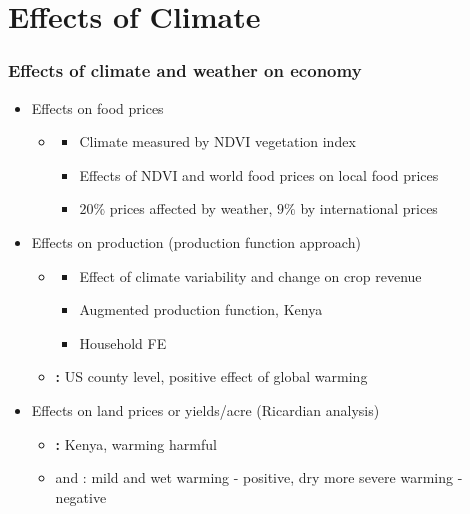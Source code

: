 \documentclass{beamer}              %
\begin{document}
\section{Effects of Climate}

\begin{frame}

\frametitle{Effects of climate and weather on economy}\label{EffectsCLimate} 


\begin{itemize}

\item Effects on food prices

\begin{itemize}

\item \textbf{\cite{Brown2015}}
\begin{itemize}
\item  Climate measured by NDVI vegetation index 
\item  Effects of NDVI and world food prices on local food prices
\item $20\%$ prices affected by weather, $9\%$ by international prices
\end{itemize}

\end{itemize}


\item Effects on production (production function approach)
\begin{itemize}
\item \textbf{\cite{Ochieng2016}}
\begin{itemize}
\item Effect of climate variability and change on crop revenue
\item Augmented production function, Kenya
\item  Household FE
\end{itemize}
\item \textbf{\cite{Deschenes2007Ric}:} US county level, positive effect of global warming
\end{itemize}
\item Effects on land prices or yields/acre (Ricardian analysis)
\begin{itemize}
\item  \textbf{\citet{kabubo2007}:} Kenya, warming harmful

\item  \cite{SeoMendelsohn} and \cite{KMendelsohn2008}: mild and wet warming - positive, dry more severe warming - negative


\end{itemize}

\end{itemize}
\end{frame}
\end{document}
